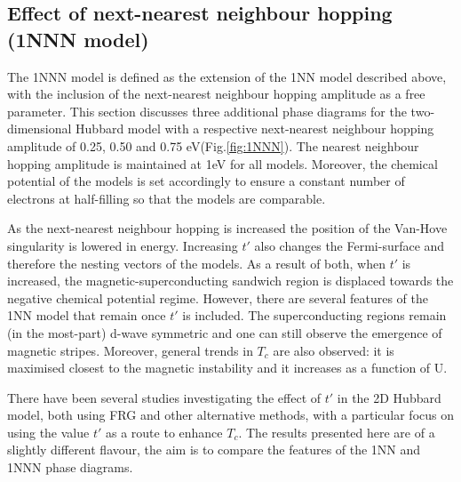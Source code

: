 \documentclass[12pt]{article}
\begin{document}
\subsection{Effect of next-nearest neighbour hopping (1NNN model)}
\label{subsec:1NNNModel}
The 1NNN model is defined as the extension of the 1NN model described above, 
with the inclusion of the next-nearest neighbour hopping amplitude as a free parameter.
This section discusses three additional phase diagrams
for the two-dimensional Hubbard model with a respective next-nearest neighbour hopping amplitude 
of 0.25, 0.50 and 0.75 eV(Fig.\ref{fig:1NNN}).
The nearest neighbour hopping amplitude is maintained at 1eV for all models. 
Moreover, the chemical potential of the models is set accordingly to ensure a 
constant number of electrons at half-filling so that the models are comparable. \par
\medskip
\noindent
As the next-nearest neighbour hopping is increased the position of the Van-Hove singularity is lowered in energy. 
Increasing $t'$ also changes the Fermi-surface and therefore the nesting vectors of the models. 
As a result of both, when $t'$ is increased, the magnetic-superconducting sandwich 
region is displaced towards the negative chemical potential regime. However, there are several features of the 1NN model that remain once $t'$ is included. 
The superconducting regions remain (in the most-part) d-wave symmetric and one can still observe the emergence of magnetic stripes. Moreover, general trends in $T_c$ are also observed: it is maximised closest to the 
magnetic instability and it increases as a function of U. \par
\medskip
\noindent There have been several studies investigating the effect of $t'$ in the 2D Hubbard model, both using FRG\cite{husemann2012incommensurate} and other alternative methods\cite{fontenele2025effects}, with a particular
focus on using the value $t'$ as a route to enhance $T_c$. 
The results presented here are of a slightly different flavour, 
the aim is to compare the features of the 1NN and 1NNN phase diagrams. 
\end{document}
